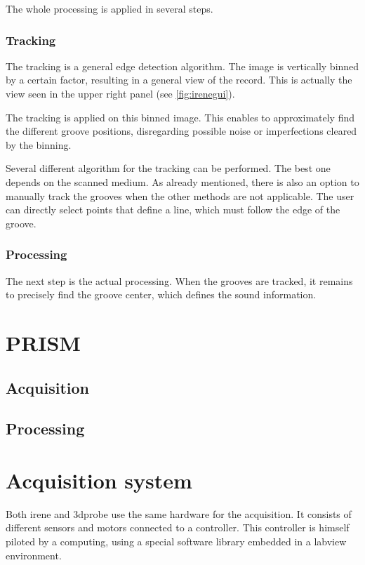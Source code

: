 The whole processing is applied in several steps.

\subsubsection{Tracking}

The tracking is a general edge detection algorithm. The image is vertically binned by a certain factor, resulting in a general view of the record. This is actually the view seen in the upper right panel (see \autoref{fig:irenegui}).

The tracking is applied on this binned image. This enables to approximately find the different groove positions, disregarding possible noise or imperfections cleared by the binning.

Several different algorithm for the tracking can be performed. The best one depends on the scanned medium. As already mentioned, there is also an option to manually track the grooves when the other methods are not applicable. The user can directly select points that define a line, which must follow the edge of the groove.

\subsubsection{Processing}

The next step is the actual processing. When the grooves are tracked, it remains to precisely find the groove center, which defines the sound information. 

\section{PRISM}

\subsection{Acquisition}

\subsection{Processing}

\section{Acquisition system}

Both \gls{irene} and \gls{3dprobe} use the same hardware for the acquisition. It consists of different sensors and motors connected to a controller. This controller is himself piloted by a computing, using a special software library embedded in a \gls{labview} environment.


